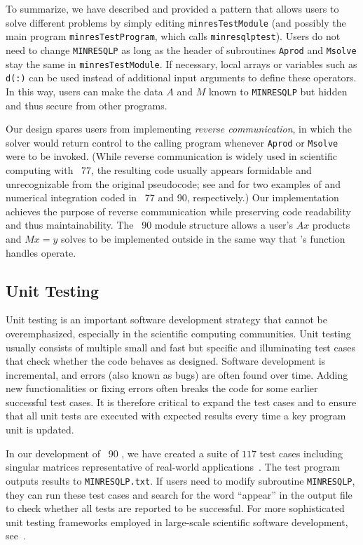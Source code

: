 \documentclass{doc_acmtrans2m}
\begin{document}
To summarize, we have described and provided a pattern that allows
\MINRESQLP users to solve different problems by simply editing
\texttt{minresTestModule} (and possibly the main program
\texttt{minresTestProgram}, which calls \texttt{minresqlptest}).
Users do not need to change \texttt{MINRESQLP} as long as the header
of subroutines \texttt{Aprod} and \texttt{Msolve} stay the same in
\texttt{minresTestModule}. If necessary, local arrays or variables
such as \texttt{d(:)} can be used instead of additional input
arguments to define these operators.  In this way, users can make the
data $A$ and $M$ known to \texttt{MINRESQLP} but hidden and thus
secure from other programs.


Our design spares users from implementing \textit{reverse communication},
in which the solver would return control to the calling program whenever
\texttt{Aprod} or \texttt{Msolve} were to be invoked.  (While reverse
communication is widely used in scientific computing with \FORTRAN~77,
the resulting code usually appears formidable and unrecognizable
from the original pseudocode; see \cite{DEK95} and \cite{OS} for two
examples of \CG and numerical integration coded in \FORTRAN~77 and 90,
respectively.)  Our \MINRESQLP implementation achieves the purpose
of reverse communication while preserving code readability and thus
maintainability. The \FORTRAN~90 module structure allows a user's $Ax$
products and $Mx=y$ solves to be implemented outside \MINRESQLP in the
same way that \MATLAB's function handles operate.


\subsection{Unit Testing}

Unit testing is an important software development strategy that cannot
be overemphasized, especially in the scientific computing
communities. Unit testing usually consists of multiple small and fast
but specific and illuminating test cases that check whether the code
behaves as designed.  Software development is incremental, and errors
(also known as bugs) are often found over time. Adding new
functionalities or fixing errors often breaks the code for some
earlier successful test cases. It is therefore critical to expand the
test cases and to ensure that all unit tests are executed with
expected results every time a key program unit is updated.

In our development of \FORTRAN~90 \MINRESQLP, we have created a suite
of $117$ test cases including singular matrices representative of
real-world applications~\cite{FSJSU,DH11}.  The test program outputs
results to \texttt{MINRESQLP.txt}. If users need to modify subroutine
\texttt{MINRESQLP}, they can run these test cases and search for the
word ``appear'' in the output file to check whether all tests are
reported to be successful.  For more sophisticated unit testing
frameworks employed in large-scale scientific software development,
see~\cite{OTL08}.
\end{document}
